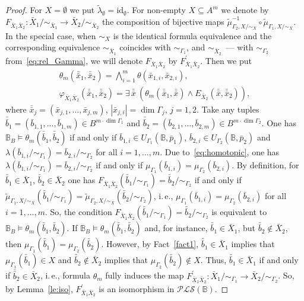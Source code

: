 \documentclass[12pt]{article}
\theoremstyle{definition}
\def\MB{{\mathbb{B}}}
\def\PLS{{\mathcal{PLS}}}
\def\id{{\mathrm{id}}}
\begin{document}
\begin{proof}
For $X=\emptyset$ we put $\tilde\lambda_\emptyset=\id_\emptyset$. For non-empty $X\subseteq A^m$ we denote by $F_{\bar X_1 \bar X_2}\colon \bar X_1/{\sim_{\bar X_1}}\to \bar X_2/{\sim_{\bar X_2}}$ the composition of bijective maps $\tilde\mu^{-1}_{\Gamma_2, X/{\sim_X}}\circ\tilde\mu_{\Gamma_1, X/{\sim_X}}$. In the special case, when $\sim_X$ is the identical formula equivalence and the corresponding equivalence $\sim_{\bar X_1}$ coincides with $\sim_{\Gamma_1}$, and $\sim_{\bar X_2}$~--- with $\sim_{\Gamma_2}$ from~\eqref{eq:rel_Gamma}, we will denote $F_{\bar X_1 \bar X_2}$ by $F^\prime_{\bar X_1 \bar X_2}$. Then we put
\begin{equation}\label{eq:F}
   \begin{gathered}
   \theta_m(\bar {\bar x}_1, \bar{\bar x}_2)=\bigwedge\limits_{i=1}^m \theta(\bar x_{1,i},\bar x_{2,i}), \\ 
\varphi_{\bar X_1 \bar X_2}(\bar {\bar x}_1, \bar{\bar x}_2)= \exists\,\bar{\bar x}\:( \theta_m(\bar {\bar x}_1, \bar{\bar x})\wedge E_{\bar X_2}(\bar {\bar x},\bar {\bar x}_2)),
\end{gathered} 
\end{equation}
where $\bar{\bar x}_j=(\bar x_{j,1},\ldots,\bar x_{j,m})$, $|\bar x_{j,i}|=\dim\Gamma_j$, $j=1,2$. Take any tuples $\bar{\bar b}_1=(\bar b_{1,1},\ldots,\bar b_{1,m})\in B^{m\cdot\dim\Gamma_1}$ and $\bar{\bar b}_2=(\bar b_{2,1},\ldots,\bar b_{2,m})\in B^{m\cdot\dim\Gamma_2}$. One has $\MB_B\models\theta_m(\bar{\bar b}_1,\bar{\bar b}_2)$ if and only if $\bar b_{1,i}\in U_{\Gamma_1}(\MB,\bar p_1)$, $\bar b_{2,i}\in U_{\Gamma_2}(\MB,\bar p_2)$ and $\lambda(\bar b_{1,i}/{\sim_{\Gamma_1}})=\bar b_{2,i}/{\sim_{\Gamma_2}}$ for all $i=1,\ldots,m$. Due to~\eqref{eq:homotopic}, one has $\lambda(\bar b_{1,i}/{\sim_{\Gamma_1}})=\bar b_{2,i}/{\sim_{\Gamma_2}}$ if and only if $\mu_{\Gamma_1}(\bar b_{1,i})=\mu_{\Gamma_2}(\bar b_{2,i})$. By definition, for $\bar{\bar b}_1\in \bar X_1$, $\bar{\bar b}_2\in \bar X_2$ one has $F_{\bar X_1 \bar X_2}(\bar{\bar b}_1/{\sim_{\Gamma_1}})=\bar{\bar b}_2/{\sim_{\Gamma_2}}$ if and only if $\tilde\mu_{\Gamma_1,X/{\sim_X}}(\bar{\bar b}_1/{\sim_{\Gamma_1}})=\tilde\mu_{\Gamma_2,X/{\sim_X}}(\bar{\bar b}_2/{\sim_{\Gamma_2}})$, i.\,e.,  $\mu_{\Gamma_1}(\bar b_{1,i})=\mu_{\Gamma_2}(\bar b_{2,i})$ for all $i=1,\ldots,m$. So, the condition $F_{\bar X_1 \bar X_2}(\bar{\bar b}_1/{\sim_{\Gamma_1}})=\bar{\bar b}_2/{\sim_{\Gamma_2}}$ is equivalent to $\MB_B\models\theta_m(\bar{\bar b}_1,\bar{\bar b}_2)$. If $\MB_B\models\theta_m(\bar{\bar b}_1,\bar{\bar b}_2)$ and, for instance, $\bar {\bar b}_1\in \bar X_1$, but $\bar {\bar b}_2\not\in \bar X_2$, then $\mu_{\Gamma_1}(\bar{\bar b}_1)=\mu_{\Gamma_2}(\bar{\bar b}_2)$. However, by Fact~\ref{fact1}, $\bar {\bar b}_1\in \bar X_1$ implies that $\mu_{\Gamma_1}(\bar{\bar b}_1)\in X$ and $\bar {\bar b}_2\not\in \bar X_2$ implies that $\mu_{\Gamma_2}(\bar{\bar b}_2)\not\in X$. Thus, $\bar{\bar b}_1\in \bar X_1$ if and only if $\bar{\bar b}_2\in \bar X_2$, i.\,e., formula $\theta_m$ fully induces the map $F^\prime_{\bar X_1 \bar X_2}\colon \bar X_1/{\sim_{\Gamma_1}}\to \bar X_2/{\sim_{\Gamma_2}}$. So, by Lemma~\ref{le:iso}, $F^\prime_{\bar X_1 \bar X_2}$ is an isomorphism in $\PLS(\MB)$. 


\end{proof}
\end{document}
